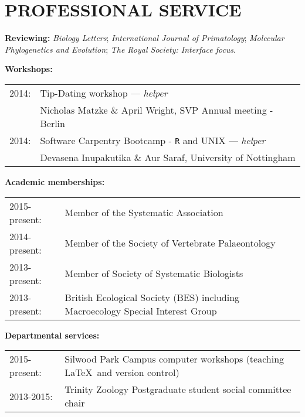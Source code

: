 \documentclass[10pt,a4paper]{article}
\begin{document}
{%
\bigskip


\section{PROFESSIONAL SERVICE}
\raggedright\textbf{Reviewing:}
\textit{Biology Letters}; \textit{International Journal of Primatology}; \textit{Molecular Phylogenetics and Evolution}; \textit{The Royal Society: Interface focus}.
\bigskip

\raggedright\textbf{Workshops:}

\begin{tabular}{ll}
2014: & Tip-Dating workshop --- \textit{helper}\\
& Nicholas Matzke \& April Wright, SVP Annual meeting - Berlin\\
2014: & Software Carpentry Bootcamp - \texttt{R} and UNIX --- \textit{helper}\\
& Devasena Inupakutika \& Aur Saraf, University of Nottingham\\
\end{tabular}

\bigskip

\raggedright\textbf{Academic memberships:}
\begin{tabular}{ll}
2015-present: & Member of the Systematic Association\\ 
2014-present: & Member of the Society of Vertebrate Palaeontology\\
2013-present: & Member of Society of Systematic Biologists\\
2013-present: & British Ecological Society (BES) including Macroecology Special Interest Group\\
\end{tabular}
\bigskip

\raggedright\textbf{Departmental services:}
\begin{tabular}{ll}
2015-present: & Silwood Park Campus computer workshops (teaching \LaTeX \ and version control) \\
2013-2015: & Trinity Zoology Postgraduate student social committee chair \\
\end{tabular}
\bigskip


}
\end{document}

